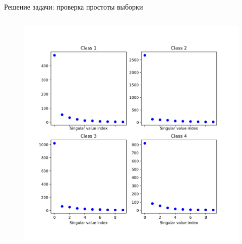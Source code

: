 \documentclass{beamer}
\begin{document}
\begin{frame}{Решение задачи: проверка простоты выборки}
\begin{columns}[T]
\begin{column}{.48\textwidth}
    \begin{figure}[ht]
        \centering
          \includegraphics[width=\textwidth]{../pics/sv_analysis.png}
    \end{figure}

        \end{column}%
    \end{columns}

\end{frame}
\end{document}
